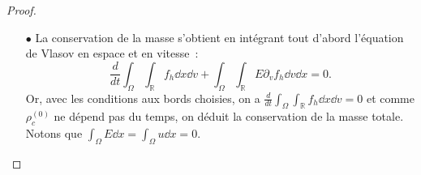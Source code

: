 \begin{proof}
%
\ 

  \begin{enumerate}
    \item[$\bullet$]La conservation de la masse s'obtient en intégrant tout d'abord l'équation de Vlasov en espace et en vitesse~: 
      $$
        \frac{d}{dt} \int_\Omega\int_{\mathbb{R}} f_h \dd{x} \dd{v} + \int_\Omega \int_{\mathbb{R}} E \partial_v f_h\dd{v}\dd{x} =0. 
      $$
      Or, avec les conditions aux bords choisies, on a  $\frac{d}{dt} \int_\Omega\int_{\mathbb{R}} f_h \dd{x}\dd{v}=0$ et comme $\rho^{(0)}_c$ ne dépend pas du temps, on déduit la conservation de la masse totale. Notons que $\int_\Omega E \dd{x} = \int_\Omega u \dd{x} = 0$. 


\end{enumerate}
\end{proof}
